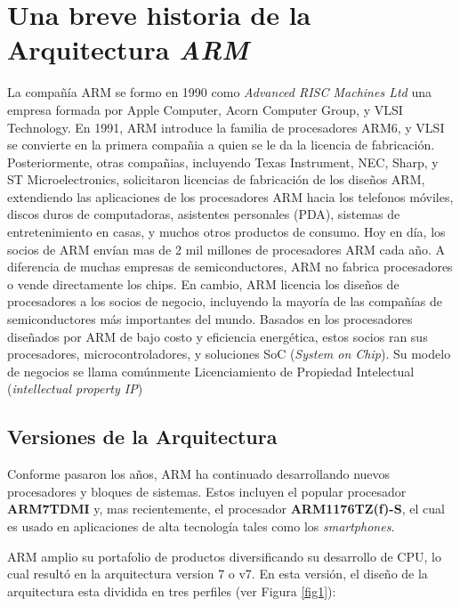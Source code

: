 \documentclass[12pt]{book}
\theoremstyle{definition}
\theoremstyle{remark}
\theoremstyle{plain}
\begin{document}
\chapter{Una breve historia de la Arquitectura \emph{ARM}}
La compañía ARM se formo en 1990 como \emph{Advanced RISC Machines Ltd} una empresa formada por Apple Computer, Acorn Computer Group, y VLSI Technology. En 1991, ARM introduce la familia de procesadores ARM6, y VLSI se convierte en la primera compañia a quien se le da la licencia de fabricación. Posteriormente, otras compañias, incluyendo Texas Instrument, NEC, Sharp, y ST Microelectronics, solicitaron licencias de fabricación de los diseños ARM, extendiendo las aplicaciones de los procesadores ARM hacia los telefonos móviles, discos duros de computadoras, asistentes personales (PDA), sistemas de entretenimiento en casas, y muchos otros productos de consumo.
Hoy en día, los socios de ARM envían mas de 2 mil millones de procesadores ARM cada año. A diferencia de muchas empresas de semiconductores, ARM no fabrica procesadores o vende directamente los chips. En cambio, ARM licencia los diseños de procesadores a los socios de negocio, incluyendo la mayoría de las compañías de semiconductores más importantes del mundo. Basados en los procesadores diseñados por ARM de bajo costo y eficiencia energética, estos socios ran sus procesadores, microcontroladores, y soluciones SoC (\emph{System on Chip}). Su modelo de negocios se llama comúnmente Licenciamiento de Propiedad Intelectual (\emph{intellectual property IP})

\section{Versiones de la Arquitectura}

Conforme pasaron los años, ARM ha continuado desarrollando nuevos procesadores y bloques de sistemas. Estos incluyen el popular procesador \textbf{ARM7TDMI} y, mas recientemente, el procesador \textbf{ARM1176TZ(f)-S}, el cual es usado en aplicaciones de alta tecnología tales como los \emph{smartphones}.

ARM amplio su portafolio de productos diversificando su desarrollo de CPU, lo cual resultó en la arquitectura version 7 o v7. En esta versión, el diseño de la arquitectura esta dividida en tres perfiles (ver Figura \ref{fig1}):
\end{document}
